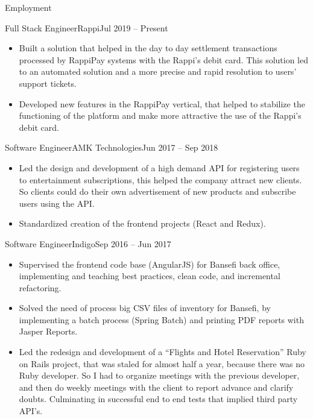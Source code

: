 \documentclass[calibri]{../macdowell-cv/mcdowellcv}
\begin{document}
	\begin{cvsection}{Employment}
		\begin{cvsubsection}{Full Stack Engineer}{Rappi}{Jul 2019 -- Present}
			\begin{itemize}
				\item Built a solution that helped in the day to day settlement transactions processed by RappiPay systems with the Rappi's debit card. This solution led to an automated solution and a more precise and rapid resolution to users' support tickets.
			\end{itemize}
			\begin{itemize}
				\item Developed new features in the RappiPay vertical, that helped to stabilize the functioning of the platform and make more attractive the use of the Rappi's debit card.
			\end{itemize}
		\end{cvsubsection}

		\begin{cvsubsection}{Software Engineer}{AMK Technologies}{Jun 2017 -- Sep 2018}
			\begin{itemize}
				\item Led the design and development of a high demand API for registering users to entertainment subscriptions, this helped the company attract new clients. So clients could do their own advertisement of new products and subscribe users using the API.
			\end{itemize}
			\begin{itemize}
				\item Standardized creation of the frontend projects (React and Redux).
			\end{itemize}
		\end{cvsubsection}

		\begin{cvsubsection}{Software Engineer}{Indigo}{Sep 2016 -- Jun 2017}		
			\begin{itemize}
				\item Supervised the frontend code base (AngularJS) for Bansefi back office, implementing and teaching best practices, clean code, and incremental refactoring.
				\item Solved the need of process big CSV files of inventory for Bansefi, by implementing a batch process (Spring Batch) and printing PDF reports with Jasper Reports.
			\end{itemize}
			\begin{itemize}
				\item Led the redesign and development of a ``Flights and Hotel Reservation'' Ruby on Rails project, that was staled for almost half a year, because there was no Ruby developer. So I had to organize meetings with the previous developer, and then do weekly meetings with the client to report advance and clarify doubts. Culminating in successful end to end tests that implied third party API's.
			\end{itemize}
		\end{cvsubsection}
		

\end{cvsection}
\end{document}
